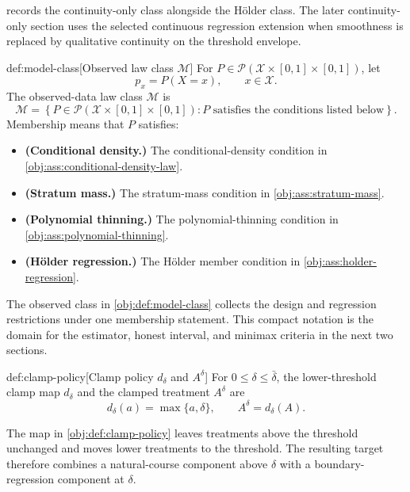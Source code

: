  records the continuity-only class  alongside the Hölder class. The later continuity-only section uses the selected continuous regression extension  when smoothness is replaced by qualitative continuity on the threshold envelope.

\begin{definitionv}{def:model-class}[Observed law class \(\mathcal M\)]
For \(P\in\mathcal P(\mathcal X\times[0,1]\times[0,1])\), let
\[
p_x=P(X=x),
\qquad x\in\mathcal X .
\]
The observed-data law class \(\mathcal M\) is
\[
\mathcal M
=
\left\{
P\in\mathcal P(\mathcal X\times[0,1]\times[0,1])
:
P\text{ satisfies the conditions listed below}
\right\}.
\]
Membership means that \(P\) satisfies:
\begin{itemize}
\item \textbf{(Conditional density.)} The conditional-density condition in \cref{obj:ass:conditional-density-law}.
\item \textbf{(Stratum mass.)} The stratum-mass condition in \cref{obj:ass:stratum-mass}.
\item \textbf{(Polynomial thinning.)} The polynomial-thinning condition in \cref{obj:ass:polynomial-thinning}.
\item \textbf{(Hölder regression.)} The Hölder member condition in \cref{obj:ass:holder-regression}.
\end{itemize}
\end{definitionv}

The observed class  in \cref{obj:def:model-class} collects the design and regression restrictions under one membership statement. This compact notation is the domain for the estimator, honest interval, and minimax criteria in the next two sections.

\begin{definitionv}{def:clamp-policy}[Clamp policy \(d_\delta\) and \(A^\delta\)]
For \(0\leq\delta\leq\bar\delta\), the lower-threshold clamp map \(d_\delta\) and the clamped treatment \(A^\delta\) are
\[
d_\delta(a)=\max\{a,\delta\},
\qquad
A^\delta=d_\delta(A).
\]
\end{definitionv}

The map  in \cref{obj:def:clamp-policy} leaves treatments above the threshold unchanged and moves lower treatments to the threshold. The resulting target therefore combines a natural-course component above \(\delta\) with a boundary-regression component at \(\delta\).

